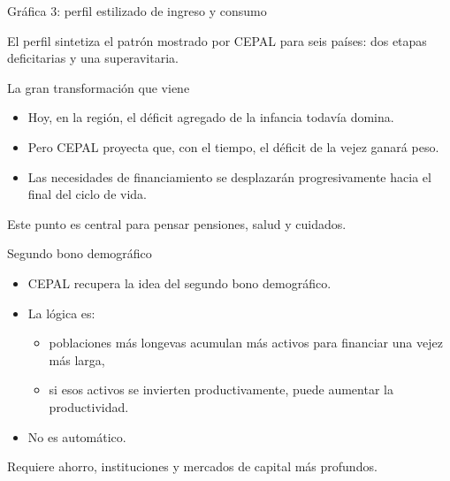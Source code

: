\documentclass{beamer}
\begin{document}
\begin{frame}{Gráfica 3: perfil estilizado de ingreso y consumo}
\centering
{}

\vspace{0.2cm}
\small
El perfil sintetiza el patrón mostrado por CEPAL para seis países: dos etapas deficitarias y una superavitaria.
\end{frame}

\begin{frame}{La gran transformación que viene}
\begin{itemize}
    \item Hoy, en la región, el déficit agregado de la infancia todavía domina.
    \item Pero CEPAL proyecta que, con el tiempo, el déficit de la vejez ganará peso.
    \item Las necesidades de financiamiento se desplazarán progresivamente hacia el final del ciclo de vida.
\end{itemize}

\vspace{0.3cm}
Este punto es central para pensar pensiones, salud y cuidados.
\end{frame}

\begin{frame}{Segundo bono demográfico}
\begin{itemize}
    \item CEPAL recupera la idea del segundo bono demográfico.
    \item La lógica es:
    \begin{itemize}
        \item poblaciones más longevas acumulan más activos para financiar una vejez más larga,
        \item si esos activos se invierten productivamente, puede aumentar la productividad.
    \end{itemize}
    \item No es automático.
\end{itemize}

\vspace{0.3cm}
Requiere ahorro, instituciones y mercados de capital más profundos.
\end{frame}
\end{document}
